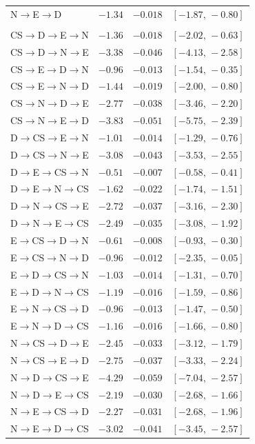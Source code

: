 \begin{longtable}{@{}p{} r r c@{}}
N$\to$E$\to$D & $-1.34$ & $-0.018$ & $[-1.87,\,-0.80]$ \\
\addlinespace
\multicolumn{4}{l}{\textit{Pipeline length 4}} \\
CS$\to$D$\to$E$\to$N & $-1.36$ & $-0.018$ & $[-2.02,\,-0.63]$ \\
CS$\to$D$\to$N$\to$E & $-3.38$ & $-0.046$ & $[-4.13,\,-2.58]$ \\
CS$\to$E$\to$D$\to$N & $-0.96$ & $-0.013$ & $[-1.54,\,-0.35]$ \\
CS$\to$E$\to$N$\to$D & $-1.44$ & $-0.019$ & $[-2.00,\,-0.80]$ \\
CS$\to$N$\to$D$\to$E & $-2.77$ & $-0.038$ & $[-3.46,\,-2.20]$ \\
CS$\to$N$\to$E$\to$D & $-3.83$ & $-0.051$ & $[-5.75,\,-2.39]$ \\
D$\to$CS$\to$E$\to$N & $-1.01$ & $-0.014$ & $[-1.29,\,-0.76]$ \\
D$\to$CS$\to$N$\to$E & $-3.08$ & $-0.043$ & $[-3.53,\,-2.55]$ \\
D$\to$E$\to$CS$\to$N & $-0.51$ & $-0.007$ & $[-0.58,\,-0.41]$ \\
D$\to$E$\to$N$\to$CS & $-1.62$ & $-0.022$ & $[-1.74,\,-1.51]$ \\
D$\to$N$\to$CS$\to$E & $-2.72$ & $-0.037$ & $[-3.16,\,-2.30]$ \\
D$\to$N$\to$E$\to$CS & $-2.49$ & $-0.035$ & $[-3.08,\,-1.92]$ \\
E$\to$CS$\to$D$\to$N & $-0.61$ & $-0.008$ & $[-0.93,\,-0.30]$ \\
E$\to$CS$\to$N$\to$D & $-0.96$ & $-0.012$ & $[-2.35,\,-0.05]$ \\
E$\to$D$\to$CS$\to$N & $-1.03$ & $-0.014$ & $[-1.31,\,-0.70]$ \\
E$\to$D$\to$N$\to$CS & $-1.19$ & $-0.016$ & $[-1.59,\,-0.86]$ \\
E$\to$N$\to$CS$\to$D & $-0.96$ & $-0.013$ & $[-1.47,\,-0.50]$ \\
E$\to$N$\to$D$\to$CS & $-1.16$ & $-0.016$ & $[-1.66,\,-0.80]$ \\
N$\to$CS$\to$D$\to$E & $-2.45$ & $-0.033$ & $[-3.12,\,-1.79]$ \\
N$\to$CS$\to$E$\to$D & $-2.75$ & $-0.037$ & $[-3.33,\,-2.24]$ \\
N$\to$D$\to$CS$\to$E & $-4.29$ & $-0.059$ & $[-7.04,\,-2.57]$ \\
N$\to$D$\to$E$\to$CS & $-2.19$ & $-0.030$ & $[-2.68,\,-1.66]$ \\
N$\to$E$\to$CS$\to$D & $-2.27$ & $-0.031$ & $[-2.68,\,-1.96]$ \\
N$\to$E$\to$D$\to$CS & $-3.02$ & $-0.041$ & $[-3.45,\,-2.57]$ \\
\end{longtable}
